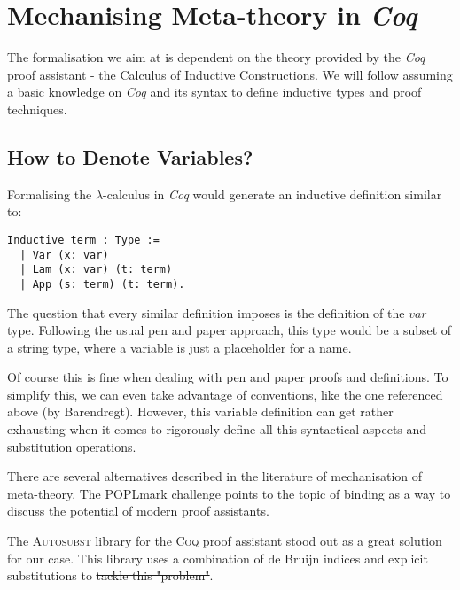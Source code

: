 
\section{Mechanising Meta-theory in \textit{Coq}}

The formalisation we aim at is dependent on the theory provided by the \textit{Coq} proof assistant - the Calculus of Inductive Constructions.
We will follow assuming a basic knowledge on \textit{Coq} and its syntax to define inductive types and proof techniques.

\subsection{How to Denote Variables?}

Formalising the $\lambda$-calculus in \textit{Coq} would generate an inductive definition similar to:

\begin{lstlisting}[language=Coq]
  Inductive term : Type :=
  | Var (x: var)
  | Lam (x: var) (t: term)
  | App (s: term) (t: term).
\end{lstlisting}

The question that every similar definition imposes is the definition of the $var$ type. Following the usual pen and paper approach, this type would be a subset of a string type, where a variable is just a placeholder for a name.

Of course this is fine when dealing with pen and paper proofs and definitions. To simplify this, we can even take advantage of conventions, like the one referenced above (by Barendregt). 
However, this variable definition can get rather exhausting  when it comes to rigorously define all this syntactical aspects and substitution operations.

There are several alternatives described in the literature of mechanisation of meta-theory. 
The POPLmark challenge \cite{POPLmark} points to the topic of binding as a way to discuss the potential of modern proof assistants.

The \textsc{Autosubst} library for the \textsc{Coq} proof assistant stood out as a great solution for our case. 
This library uses a combination of de Bruijn indices and explicit substitutions to \sout{tackle this "problem"}.

